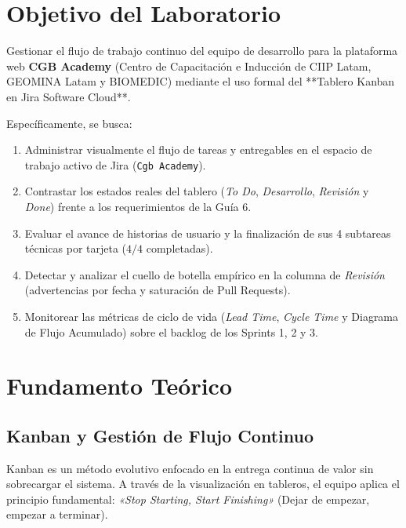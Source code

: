 \documentclass[11pt,a4paper]{article}
\begin{document}
\tableofcontents
\newpage

\section{Objetivo del Laboratorio}

Gestionar el flujo de trabajo continuo del equipo de desarrollo para la plataforma web \textbf{CGB Academy} (Centro de Capacitación e Inducción de CIIP Latam, GEOMINA Latam y BIOMEDIC) mediante el uso formal del **Tablero Kanban en Jira Software Cloud**.

Específicamente, se busca:
\begin{enumerate}[label=\alph*)]
    \item Administrar visualmente el flujo de tareas y entregables en el espacio de trabajo activo de Jira (\texttt{Cgb Academy}).
    \item Contrastar los estados reales del tablero (\textit{To Do}, \textit{Desarrollo}, \textit{Revisión} y \textit{Done}) frente a los requerimientos de la Guía 6.
    \item Evaluar el avance de historias de usuario y la finalización de sus 4 subtareas técnicas por tarjeta ($4/4$ completadas).
    \item Detectar y analizar el cuello de botella empírico en la columna de \textit{Revisión} (advertencias por fecha y saturación de Pull Requests).
    \item Monitorear las métricas de ciclo de vida (\textit{Lead Time}, \textit{Cycle Time} y Diagrama de Flujo Acumulado) sobre el backlog de los Sprints 1, 2 y 3.
\end{enumerate}

\section{Fundamento Teórico}

\subsection{Kanban y Gestión de Flujo Continuo}
Kanban es un método evolutivo enfocado en la entrega continua de valor sin sobrecargar el sistema. A través de la visualización en tableros, el equipo aplica el principio fundamental: \textit{«Stop Starting, Start Finishing»} (Dejar de empezar, empezar a terminar).
\end{document}
